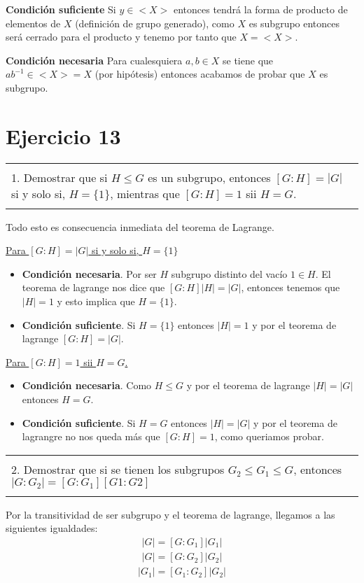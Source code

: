 \documentclass[12pt]{article}
\newenvironment{micaja}
{
    \begin{center}
    \begin{tabular}{|p{0.9\textwidth}|}
    \hline\\
    }   
    {   
    \\\\\hline
    \end{tabular} 
    \end{center}
    }
\begin{document}
\textbf{Condición suficiente}
Si $y \in <X>$ entonces tendrá la forma de producto de elementos de $X$ (definición de grupo generado),
 como $X$ es subgrupo entonces será cerrado para el producto y tenemo por tanto que $X = <X>$.

 \textbf{Condición necesaria}
Para cualesquiera $a,b \in X$ se tiene que $ab^{-1} \in <X> = X$ (por hipótesis) entonces acabamos de probar
que $X$ es subgrupo. 


\section[Ejercicio 13]{Ejercicio 13}

    \begin{micaja}
    1. Demostrar que si $H \leq G$ es un subgrupo, entonces $[G:H] = |G|$ si y solo si, $H=\{1\}$, mientras que 
    $[G:H]=1$ sii $H=G$.
    \end{micaja}

    Todo esto es consecuencia inmediata del teorema de Lagrange.
    
    
\underline{Para $[G:H] = |G|$ si y solo si, $H=\{1\}$}

    \begin{itemize}
        \item 
   
    \textbf{Condición necesaria}. Por ser $H$ subgrupo distinto del vacío $1\in H$. El teorema de lagrange nos dice 
    que $[G:H] |H| = |G|$, entonces tenemos que $|H|=1$ y esto implica que $H=\{1\}$.

    \item \textbf{Condición suficiente}. Si $H=\{1\}$ entonces $|H|=1$ y por el teorema de lagrange $[G:H] = |G|$.
    \end{itemize}

    \underline{Para $[G:H]=1$ sii $H=G$.}
    \begin{itemize}
    \item \textbf{Condición necesaria}. Como  $H \leq G$ y por el teorema de lagrange $|H| = |G|$ entonces   $H=G$.
    \item\textbf{Condición suficiente}. Si $H=G$ entonces $|H| = |G|$ y por el teorema de lagrangre no nos queda más que $[G:H]=1$, 
    como queriamos probar. 
\end{itemize}   
    \begin{micaja}
    2. Demostrar que si se tienen los subgrupos $G_2 \leq G_1 \leq G$, entonces $|G:G_2| = [G:G_1][G1:G2]$
    \end{micaja}
Por la transitividad de ser subgrupo y el teorema de lagrange, llegamos a las siguientes igualdades:
    \begin{align}
        |G| = [G:G_1] |G_1|
    \end{align}
    \begin{align}
        |G| = [G:G_2] |G_2|
    \end{align}
    \begin{align}
        |G_1| = [G_1:G_2] |G_2|
    \end{align}
\end{document}
